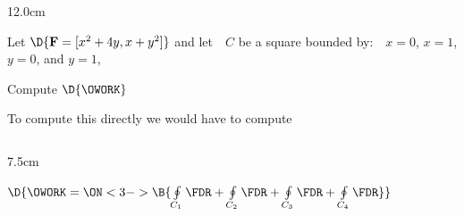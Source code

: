 %
%	

\begin{frame}
\begin{columns}\begin{column}{12.0cm}

\scriptsize

\EX Let $\D{{\bf F} = [x^2 + 4y, x + y^2]}$ and let \,\, $C$ be a square bounded by: \,\, $x=0$, $x=1$, $y=0$, and $y=1$,

\vspace{0.2cm}

Compute \quad $\D{\OWORK}$

\vspace{0.2cm}

To compute this directly we would have to compute 

\begin{columns}
\begin{column}{7.5cm}

\vspace{0.3cm}

$\D{\OWORK = 
\ON<3->{\B{\oint \limits_{C_1} \FDR + \oint \limits_{C_2} \FDR + \oint \limits_{C_3} \FDR + \oint \limits_{C_4} \FDR}}}$

\vspace{0.3cm}


\vspace{0.3cm}


\vspace{0.3cm}



\end{column}
\end{columns}
\end{column}
\end{columns}
\end{frame}
